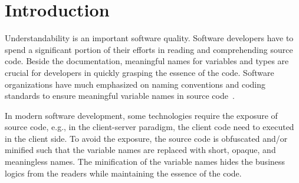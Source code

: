 \section{Introduction}
\label{intro:sec}

Understandability is an important software quality. Software
developers have to spend a significant portion of their efforts in
reading and comprehending source code. Beside the documentation,
meaningful names for variables and types are crucial for developers in
quickly grasping the essence of the code. Software organizations have
much emphasized on naming conventions and coding standards to ensure
meaningful variable names in source
code~\cite{barr-codeconvention-fse14}.



In modern software development, some technologies require the exposure
of source code, e.g., in the client-server paradigm, the client code
need to executed in the client side. To avoid the exposure, the source
code is obfuscated and/or minified such that the variable names are
replaced with short, opaque, and meaningless names.  The minification
of the variable names hides the business logics from the readers while
maintaining the essence of the code.



%
%

